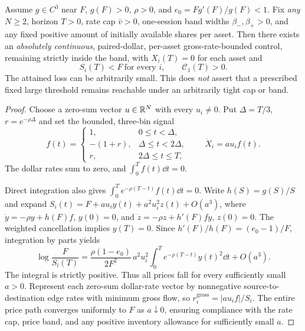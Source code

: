 \documentclass[review,hidelinks,onefignum,onetabnum]{siamonline250211}
\begin{document}
\begin{theorem}\label{thm:finite-rate-construct}
Assume $g\in C^3$ near $F$, $g(F)>0$, $\rho>0$, and $e_0=Fg'(F)/g(F)<1$. Fix \emph{any} $N\ge2$, horizon $T>0$, rate cap $\bar v>0$, one-session band widths $\beta_-,\beta_+>0$, and any fixed positive amount of initially available shares per asset. Then there exists an \emph{absolutely continuous}, paired-dollar, per-asset gross-rate-bounded control, remaining strictly inside the band, with $X_i(T)=0$ for each asset and
\begin{equation}\label{eq:local-speed-crash}
 \boxed{\ S_i(T)<F\ \text{for every }i,\qquad \mathcal C_1(T)>0.\ }
\end{equation}
The attained loss can be arbitrarily small. This does \emph{not} assert that a prescribed fixed large threshold remains reachable under an arbitrarily tight cap or band.
\end{theorem}
\begin{proof}
Choose a zero-sum vector $u\in\mathbb{R}^N$ with every $u_i\ne0$. Put $\Delta=T/3$, $r=e^{-\rho\Delta}$ and set the bounded, three-bin signal
\begin{equation}\label{eq:bounded-control}
 f(t)=
 \begin{cases}
 1,&0\le t<\Delta,\\
 -(1+r),&\Delta\le t<2\Delta,\\
 r,&2\Delta\le t\le T,
 \end{cases}
 \qquad \dot X_i=a u_i f(t).
\end{equation}
The dollar rates sum to zero, and $\int_0^T f(t)\dd t=0$.
\par
Direct integration also gives $\int_0^T e^{-\rho(T-t)}f(t)\dd t=0$.
Write $h(S)=g(S)/S$ and expand
$S_i(t)=F+a u_i y(t)+a^2u_i^2 z(t)+O(a^3)$,
where $\dot y=-\rho y+h(F)f$, $y(0)=0$, and
$\dot z=-\rho z+h'(F)f y$, $z(0)=0$.
The weighted cancellation implies $y(T)=0$. Since $h'(F)/h(F)=(e_0-1)/F$, integration by parts yields
\begin{equation}\label{eq:finite-rate-coefficient}
 \boxed{\ \log\frac{F}{S_i(T)}=
 \frac{\rho(1-e_0)}{2F^2}\,a^2u_i^2
 \int_0^T e^{-\rho(T-t)}y(t)^2\dd t+O(a^3).\ }
\end{equation}
The integral is strictly positive. Thus all prices fall for every sufficiently small $a>0$. Represent each zero-sum dollar-rate vector by nonnegative source-to-destination edge rates with minimum gross flow, so $r_i^{\mathrm{gross}}=|a u_i f|/S_i$. The entire price path converges uniformly to $F$ as $a\downarrow0$, ensuring compliance with the rate cap, price band, and any positive inventory allowance for sufficiently small $a$.
\end{proof}
\end{document}
